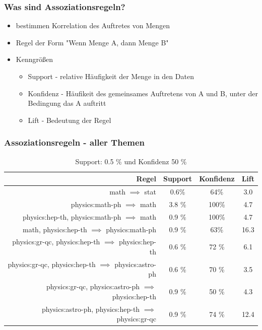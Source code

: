 \documentclass[12pt, xcolor=table]{beamer}
\begin{document}
\begin{frame}
	\frametitle{Was sind Assoziationsregeln?}
	\begin{itemize}
		\item bestimmen Korrelation des Auftretes von Mengen
		\item Regel der Form "Wenn Menge A, dann Menge B"
		\item Kenngrößen
		\begin{itemize}
			\item Support - relative Häufigkeit der Menge in den Daten
	 		\item Konfidenz - Häufikeit des gemeinsames Auftretens von A und B, unter der Bedingung das A auftritt
	 		\item Lift - Bedeutung der Regel
	\end{itemize}
	\end{itemize}
\end{frame}
\begin{frame}
	\frametitle{Assoziationsregeln - aller Themen}
	\begin{center}
	\begin{table}
	\begin{tabular}{rccc}
		\tiny\textbf{Regel} &\tiny \textbf{Support} &\tiny \textbf{Konfidenz} & \tiny \textbf{Lift}\\
		\hline
		\tiny math $\implies$ stat & \tiny 0.6\% &\tiny 64\% &\tiny 3.0  \\
		\tiny physics:math-ph $\implies$ math &\tiny 3.8 \% &\tiny 100\% &\tiny 4.7 \\
		\tiny physics:hep-th, physics:math-ph  $\implies$ math &\tiny 0.9 \% &\tiny 100\% &\tiny 4.7 \\
		\tiny math, physics:hep-th  $\implies$ physics:math-ph  &\tiny 0.9 \% &\tiny 63\% &\tiny 16.3 \\
		\tiny physics:gr-qc, physics:hep-th $\implies$ physics:hep-th &\tiny 0.6 \% &\tiny 72 \% &\tiny 6.1 \\
		\tiny physics:gr-qc, physics:hep-th $\implies$ physics:astro-ph &\tiny 0.6 \% &\tiny 70 \% &\tiny 3.5 \\
		\tiny physics:gr-qc, physics:astro-ph $\implies$ physics:hep-th &\tiny 0.9 \% &\tiny 50 \%  &\tiny 4.3 \\
		\tiny physics:astro-ph, physics:hep-th $\implies$ physics:gr-qc  &\tiny 0.9 \% &\tiny 74 \% &\tiny 12.4 \\
	\end{tabular}
	 \caption*{Support: 0.5 \% und Konfidenz 50 \%}
	\end{table}
	\end{center}
\end{frame}
\end{document}
